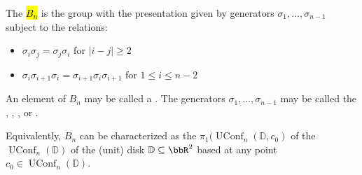 \begin{definition} \label{definition:artin_braid_group}
The  \hl{$B_n$} is the group with the presentation given by generators $\sigma_1, \dots, \sigma_{n-1}$ subject to the relations:
\begin{itemize}
    \item $\sigma_i \sigma_j = \sigma_j \sigma_i$ for $|i - j| \geq 2$
    \item $\sigma_i \sigma_{i+1} \sigma_i = \sigma_{i+1} \sigma_i \sigma_{i+1}$ for $1 \leq i \leq n-2$
\end{itemize}
An element of $B_n$ may be called a . The generators $\sigma_1,\ldots, \sigma_{n-1}$ may be called the , , , or .

Equivalently, $B_n$ can be characterized as the  $\pi_1(\operatorname{UConf}_n(\mathbb{D}, c_0)$ of the  $\operatorname{UConf}_n(\mathbb{D})$ of the (unit) disk $\mathbb{D} \subseteq \bbR^2$ based at any point $c_0 \in \operatorname{UConf}_n(\mathbb{D})$.
\end{definition}